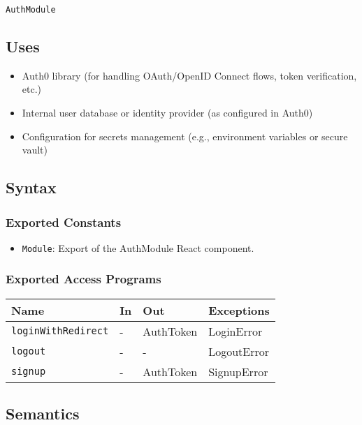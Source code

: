 \documentclass[12pt, titlepage]{article}
\begin{document}
\texttt{AuthModule}

\subsection{Uses}

\begin{itemize}
    \item Auth0 library (for handling OAuth/OpenID Connect flows, token verification, etc.)
    \item Internal user database or identity provider (as configured in Auth0)
    \item Configuration for secrets management (e.g., environment variables or secure vault)
\end{itemize}

\subsection{Syntax}

\subsubsection{Exported Constants}

\begin{itemize}
    \item \texttt{Module}: Export of the AuthModule React component.
\end{itemize}

\subsubsection{Exported Access Programs}

\begin{center}
\begin{tabular}{p{5cm} p{3.5cm} p{3.5cm} p{2cm}}
\hline
\textbf{Name} & \textbf{In} & \textbf{Out} & \textbf{Exceptions} \\
\hline
\texttt{loginWithRedirect} & - & AuthToken & LoginError \\
\texttt{logout} & - & - & LogoutError \\
\texttt{signup} & - & AuthToken & SignupError \\
\hline
\end{tabular}
\end{center}

\subsection{Semantics}
\end{document}

